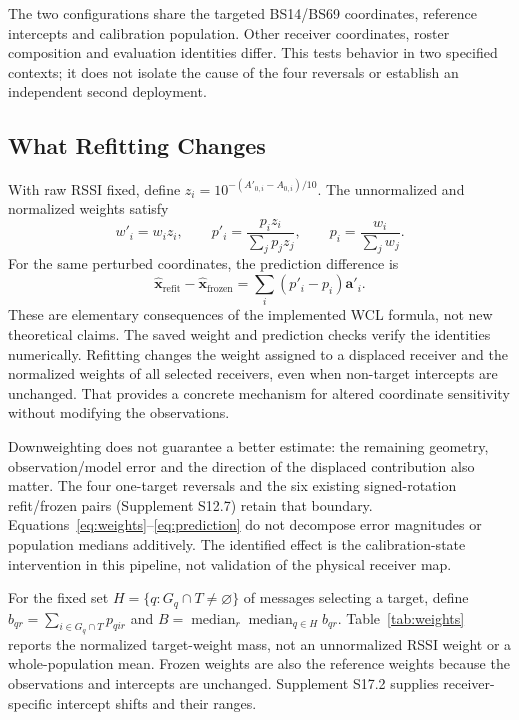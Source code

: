 \documentclass[11pt,a4paper]{article}
\begin{document}
The two configurations share the targeted BS14/BS69 coordinates, reference intercepts and calibration population. Other receiver coordinates, roster composition and evaluation identities differ. This tests behavior in two specified contexts; it does not isolate the cause of the four reversals or establish an independent second deployment.

\subsection{What Refitting Changes}\label{sec:weights}
With raw RSSI fixed, define $z_i=10^{-(A'_{0,i}-A_{0,i})/10}$. The unnormalized and normalized weights satisfy
\begin{equation}
 w'_i=w_i z_i,\qquad p'_i=\frac{p_i z_i}{\sum_j p_j z_j},\qquad p_i=\frac{w_i}{\sum_jw_j}.
\label{eq:weights}
\end{equation}
For the same perturbed coordinates, the prediction difference is
\begin{equation}
 \widehat{\mathbf x}_{\mathrm{refit}}-\widehat{\mathbf x}_{\mathrm{frozen}}
 =\sum_i(p'_i-p_i)\mathbf a'_i.
\label{eq:prediction}
\end{equation}
These are elementary consequences of the implemented WCL formula, not new theoretical claims. The saved weight and prediction checks verify the identities numerically. Refitting changes the weight assigned to a displaced receiver and the normalized weights of all selected receivers, even when non-target intercepts are unchanged. That provides a concrete mechanism for altered coordinate sensitivity without modifying the observations.

Downweighting does not guarantee a better estimate: the remaining geometry, observation/model error and the direction of the displaced contribution also matter. The four one-target reversals and the six existing signed-rotation refit/frozen pairs (Supplement S12.7) retain that boundary. Equations~\ref{eq:weights}--\ref{eq:prediction} do not decompose error magnitudes or population medians additively. The identified effect is the calibration-state intervention in this pipeline, not validation of the physical receiver map.

For the fixed set $H=\{q:G_q\cap T\ne\varnothing\}$ of messages selecting a target, define $b_{qr}=\sum_{i\in G_q\cap T}p_{qir}$ and $B=\operatorname{median}_r\operatorname{median}_{q\in H}b_{qr}$. Table~\ref{tab:weights} reports the normalized target-weight mass, not an unnormalized RSSI weight or a whole-population mean. Frozen weights are also the reference weights because the observations and intercepts are unchanged. Supplement S17.2 supplies receiver-specific intercept shifts and their ranges.
\end{document}
